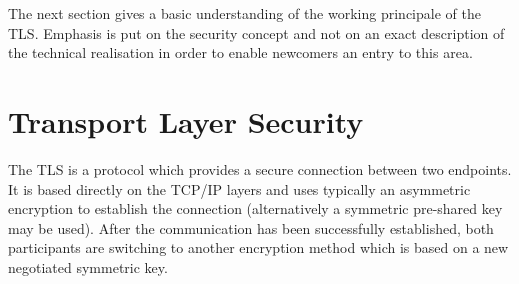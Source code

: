 The next section gives a basic understanding of the working principale of the TLS. Emphasis is put on the security concept and not on an exact description of the technical realisation in order to enable newcomers an entry to  this area.




\section{Transport Layer Security}


The TLS is a protocol which provides a secure connection between two endpoints.
It is based directly on the TCP/IP layers and uses typically an asymmetric encryption to establish the connection (alternatively a symmetric pre-shared key may be used).
After the communication has been successfully established, both participants are switching to another encryption method which is based on a new negotiated symmetric key.\\
%
%


